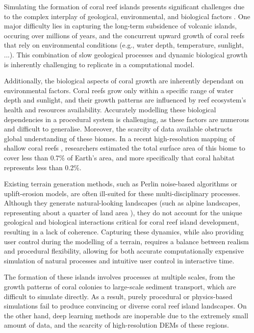 Simulating the formation of coral reef islands presents significant challenges due to the complex interplay of geological, environmental, and biological factors \cite{Hopley2014}. One major difficulty lies in capturing the long-term subsidence of volcanic islands, occuring over millions of years, and the concurrent upward growth of coral reefs that rely on environmental conditions (e.g., water depth, temperature, sunlight, ...). This combination of slow geological processes and dynamic biological growth is inherently challenging to replicate in a computational model.

Additionally, the biological aspects of coral growth are inherently dependant on environmental factors. Coral reefs grow only within a specific range of water depth and sunlight, and their growth patterns are influenced by reef ecosystem's health and resources availability. Accurately modelling these biological dependencies in a procedural system is challenging, as these factors are numerous and difficult to generalise. Moreover, the scarcity of data available obstructs global understanding of these biomes. In a recent high-resolution mapping of shallow coral reefs \cite{Lyons2024}, researchers estimated the total surface area of this biome to cover less than 0.7\% of Earth's area, and more specifically that coral habitat represents less than 0.2\%.

Existing terrain generation methods, such as Perlin noise-based algorithms or uplift-erosion models, are often ill-suited for these multi-disciplinary processes. Although they generate natural-looking landscapes (such as alpine landscapes, representing about a quarter of land area \cite{Korner2014}), they do not account for the unique geological and biological interactions critical for coral reef island development, resulting in a lack of coherence. Capturing these dynamics, while also providing user control during the modelling of a terrain, requires a balance between realism and procedural flexibility, allowing for both accurate computationally expensive simulation of natural processes and intuitive user control in interactive time.

The formation of these islands involves processes at multiple scales, from the growth patterns of coral colonies to large-scale sediment transport, which are difficult to simulate directly. As a result, purely procedural or physics-based simulations fail to produce convincing or diverse coral reef island landscapes. On the other hand, deep learning methods are inoperable due to the extremely small amount of data, and the scarcity of high-resolution DEMs of these regions.

